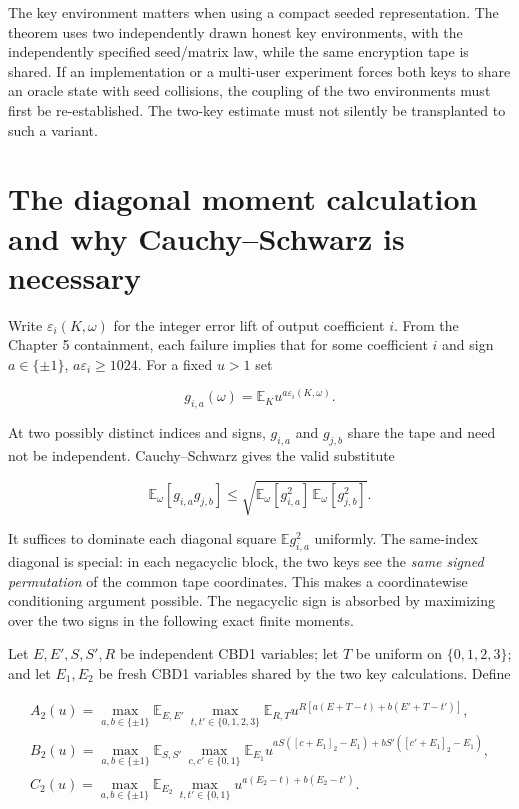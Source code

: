 \documentclass[
  11pt,
  a4paper,
  oneside]{report}
\begin{document}
The key environment matters when using a compact seeded representation.
The theorem uses two independently drawn honest key environments, with
the independently specified seed/matrix law, while the same encryption
tape is shared. If an implementation or a multi-user experiment forces
both keys to share an oracle state with seed collisions, the coupling of
the two environments must first be re-established. The two-key estimate
must not silently be transplanted to such a variant.

\section{The diagonal moment calculation and why Cauchy--Schwarz is
necessary}\label{the-diagonal-moment-calculation-and-why-cauchyschwarz-is-necessary}

Write \(\varepsilon_i(K,\omega)\) for the integer error lift of output
coefficient \(i\). From the Chapter 5 containment, each failure implies
that for some coefficient \(i\) and sign \(a\in\{\pm1\}\),
\(a\varepsilon_i\ge1024\). For a fixed \(u>1\) set

\[
g_{i,a}(\omega)=\mathbb E_K u^{a\varepsilon_i(K,\omega)}.
\]

At two possibly distinct indices and signs, \(g_{i,a}\) and \(g_{j,b}\)
share the tape and need not be independent. Cauchy--Schwarz gives the
valid substitute

\[
\mathbb E_\omega[g_{i,a}g_{j,b}]
\le
\sqrt{\mathbb E_\omega[g_{i,a}^2]\,\mathbb E_\omega[g_{j,b}^2]}.
\]

It suffices to dominate each diagonal square \(\mathbb E g_{i,a}^2\)
uniformly. The same-index diagonal is special: in each negacyclic block,
the two keys see the \emph{same signed permutation} of the common tape
coordinates. This makes a coordinatewise conditioning argument possible.
The negacyclic sign is absorbed by maximizing over the two signs in the
following exact finite moments.

Let \(E,E',S,S',R\) be independent CBD1 variables; let \(T\) be uniform
on \(\{0,1,2,3\}\); and let \(E_1,E_2\) be fresh CBD1 variables shared
by the two key calculations. Define

\[
\begin{aligned}
A_2(u)=\max_{a,b\in\{\pm1\}}\mathbb E_{E,E'}\,
\max_{t,t'\in\{0,1,2,3\}}
\mathbb E_{R,T}
 u^{R[a(E+T-t)+b(E'+T-t')]},\\
B_2(u)=\max_{a,b\in\{\pm1\}}\mathbb E_{S,S'}\,
\max_{c,c'\in\{0,1\}}
\mathbb E_{E_1}
 u^{aS([c+E_1]_2-E_1)+bS'([c'+E_1]_2-E_1)},\\
C_2(u)=\max_{a,b\in\{\pm1\}}
\mathbb E_{E_2}\,
\max_{t,t'\in\{0,1\}}
 u^{a(E_2-t)+b(E_2-t')}.
\end{aligned}
\]
\end{document}
